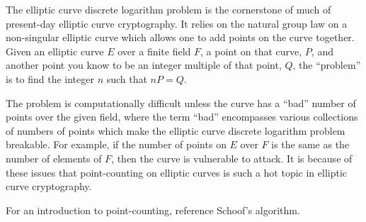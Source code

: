 \documentclass[12pt]{article}
\begin{document}
The elliptic curve discrete logarithm problem is the cornerstone of much of present-day elliptic curve cryptography.  It relies on the natural group law on a non-singular elliptic curve which allows one to add points on the curve together.  Given an elliptic curve $E$ over a finite field $F$, a point on that curve, $P$, and another point you know to be an integer multiple of that point, $Q$, the ``problem'' is to find the integer $n$ such that $nP=Q$.

The problem is computationally difficult unless the curve has a ``bad'' number of points over the given field, where the term ``bad'' encompasses various collections of numbers of points which make the elliptic curve discrete logarithm problem breakable.  For example, if the number of points on $E$ over $F$ is the same as the number of elements of $F$, then the curve is vulnerable to attack.  It is because of these issues that point-counting on elliptic curves is such a hot topic in elliptic curve cryptography.

For an introduction to point-counting, reference Schoof's algorithm.
\end{document}
